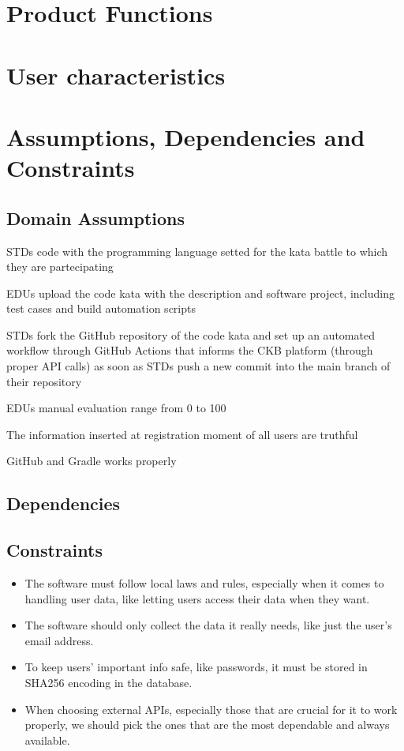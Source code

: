 {\color{red}
\section{Product Functions}
\section{User characteristics}
\section{Assumptions, Dependencies and Constraints}
\subsection{Domain Assumptions}
    \begin{assumptionsenumerate}
        \item STDs code with the programming language setted for the kata battle to which they are partecipating
        \item EDUs upload the code kata with the description and software project, including test cases and build automation scripts
        \item STDs fork the GitHub repository of the code kata and set up an automated workflow through GitHub Actions that informs the CKB platform (through proper API calls) as soon as STDs push a new commit into the main branch of their repository
        \item EDUs manual evaluation range from 0 to 100
        \item The information inserted at registration moment of all users are truthful
        \item GitHub and Gradle works properly
    \end{assumptionsenumerate}
\subsection{Dependencies}
}
\subsection{Constraints}

\begin{itemize}
    \item The software must follow local laws and rules, especially when it comes to handling user data, like letting users access their data when they want.
    \item The software should only collect the data it really needs, like just the user's email address.
    \item To keep users' important info safe, like passwords, it must be stored in SHA256 encoding in the database.
    \item When choosing external APIs, especially those that are crucial for it to work properly, we should pick the ones that are the most dependable and always available.
\end{itemize}